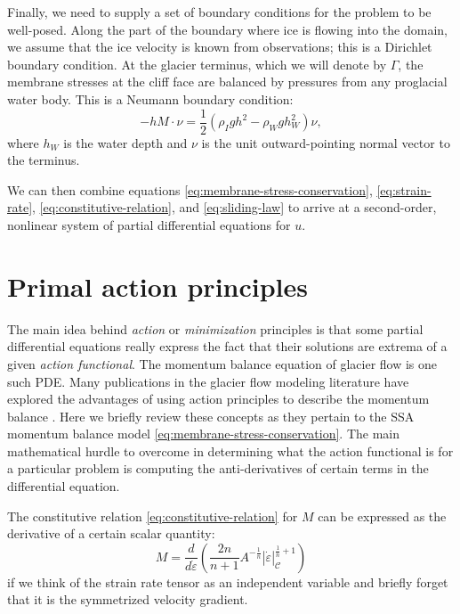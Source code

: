 \documentclass{article}
\theoremstyle{definition}
\theoremstyle{plain}
\begin{document}
Finally, we need to supply a set of boundary conditions for the problem to be well-posed.
Along the part of the boundary where ice is flowing into the domain, we assume that the ice velocity is known from observations; this is a Dirichlet boundary condition.
At the glacier terminus, which we will denote by $\Gamma$, the membrane stresses at the cliff face are balanced by pressures from any proglacial water body.
This is a Neumann boundary condition:
\begin{equation}
    -hM\cdot\nu = \frac{1}{2}\left(\rho_Igh^2 - \rho_Wgh_W^2\right)\nu,
    \label{eq:terminus-bc}
\end{equation}
where $h_W$ is the water depth and $\nu$ is the unit outward-pointing normal vector to the terminus.

We can then combine equations \eqref{eq:membrane-stress-conservation}, \eqref{eq:strain-rate}, \eqref{eq:constitutive-relation}, and \eqref{eq:sliding-law} to arrive at a second-order, nonlinear system of partial differential equations for $u$.



\section{Primal action principles}
\label{sec:primal-action-principles}

The main idea behind \emph{action} or \emph{minimization} principles is that some partial differential equations really express the fact that their solutions are extrema of a given \emph{action functional}.
The momentum balance equation of glacier flow is one such PDE.
Many publications in the glacier flow modeling literature have explored the advantages of using action principles to describe the momentum balance \citep{bassis2010hamilton, dukowicz2010consistent, brinkerhoff2013data, shapero2021icepack}.
Here we briefly review these concepts as they pertain to the SSA momentum balance model \eqref{eq:membrane-stress-conservation}.
The main mathematical hurdle to overcome in determining what the action functional is for a particular problem is computing the anti-derivatives of certain terms in the differential equation.

The constitutive relation \eqref{eq:constitutive-relation} for $M$ can be expressed as the derivative of a certain scalar quantity:
\begin{equation}
    M = \frac{d}{d\dot\varepsilon}\left(\frac{2n}{n + 1}A^{-\frac{1}{n}}|\dot\varepsilon|_{\mathscr C}^{\frac{1}{n} + 1}\right)
    \label{eq:M-anti-derivative}
\end{equation}
if we think of the strain rate tensor as an independent variable and briefly forget that it is the symmetrized velocity gradient.
\end{document}
